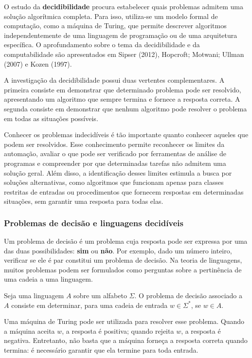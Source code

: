 \documentclass[
  brazilian,
  letterpaper,
]{book}
\theoremstyle{plain}
\theoremstyle{definition}
\theoremstyle{remark}
\begin{document}
O estudo da \textbf{decidibilidade} procura estabelecer quais problemas
admitem uma solução algorítmica completa. Para isso, utiliza-se um
modelo formal de computação, como a máquina de Turing, que permite
descrever algoritmos independentemente de uma linguagem de programação
ou de uma arquitetura específica. O aprofundamento sobre o tema da
decidibilidade e da computabilidade são apresentados em Sipser (2012),
Hopcroft; Motwani; Ullman (2007) e Kozen (1997).

A investigação da decidibilidade possui duas vertentes complementares. A
primeira consiste em demonstrar que determinado problema pode ser
resolvido, apresentando um algoritmo que sempre termina e fornece a
resposta correta. A segunda consiste em demonstrar que nenhum algoritmo
pode resolver o problema em todas as situações possíveis.

Conhecer os problemas indecidíveis é tão importante quanto conhecer
aqueles que podem ser resolvidos. Esse conhecimento permite reconhecer
os limites da automação, avaliar o que pode ser verificado por
ferramentas de análise de programas e compreender por que determinadas
tarefas não admitem uma solução geral. Além disso, a identificação
desses limites estimula a busca por soluções alternativas, como
algoritmos que funcionam apenas para classes restritas de entradas ou
procedimentos que fornecem respostas em determinadas situações, sem
garantir uma resposta para todas elas.

\subsubsection{Problemas de decisão e linguagens
decidíveis}\label{problemas-de-decisuxe3o-e-linguagens-deciduxedveis}

Um problema de decisão é um problema cuja resposta pode ser expressa por
uma das duas possibilidades: \textbf{sim} ou \textbf{não}. Por exemplo,
dado um número inteiro, verificar se ele é par constitui um problema de
decisão. Na teoria de linguagens, muitos problemas podem ser formulados
como perguntas sobre a pertinência de uma cadeia a uma linguagem.

Seja uma linguagem \(A\) sobre um alfabeto \(\Sigma\). O problema de
decisão associado a \(A\) consiste em determinar, para uma cadeia de
entrada \(w\in\Sigma^*\), se \(w\in A\).

Uma máquina de Turing pode ser utilizada para resolver esse problema.
Quando a máquina aceita \(w\), a resposta é positiva; quando rejeita
\(w\), a resposta é negativa. Entretanto, não basta que a máquina
forneça a resposta correta quando termina: é necessário garantir que ela
termine para toda entrada.
\end{document}
